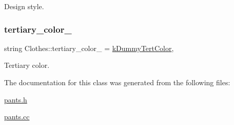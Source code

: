 Design style. 

\mbox{\label{classClothes_a3c5f1e7ab531e3ba7a38b930da8078a0}} 
\subsubsection{\texorpdfstring{tertiary\+\_\+color\+\_\+}{tertiary\_color\_}}
{\footnotesize\ttfamily string Clothes\+::tertiary\+\_\+color\+\_\+ = \mbox{\hyperlink{clothes_8h_a094dde85547895fd70dafb3ab10c6783}{k\+Dummy\+Tert\+Color}}\hspace{0.3cm}{\ttfamily [protected]}, {\ttfamily [inherited]}}



Tertiary color. 



The documentation for this class was generated from the following files\+:\begin{DoxyCompactItemize}
\item 
\mbox{\hyperlink{pants_8h}{pants.\+h}}\item 
\mbox{\hyperlink{pants_8cc}{pants.\+cc}}\end{DoxyCompactItemize}
